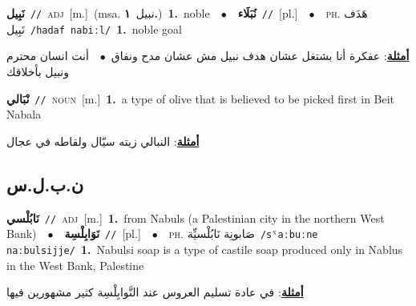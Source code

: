 \documentclass[10pt,a4paper,twoside]{article} %
\begin{document}
\begin{multicols}{2}
{\setlength\topsep{0pt}\textbf{\foreignlanguage{arabic}{نَبِيل}}\ {\color{gray}\texttt{//}\color{black}}\ \textsc{adj}\ [m.]\ \color{gray}(msa. \foreignlanguage{arabic}{نبيل}~\foreignlanguage{arabic}{\textbf{١.}})\color{black}\ \textbf{1.}~noble\ \ $\bullet$\ \ \setlength\topsep{0pt}\textbf{\foreignlanguage{arabic}{نُبَلَاء}}\ {\color{gray}\texttt{//}\color{black}}\ [pl.]\ \ $\bullet$\ \ \textsc{ph.} \color{gray} \foreignlanguage{arabic}{هَدَف نَبِيل}\color{black}\ {\color{gray}\texttt{/{\sffamily hadaf nabiːl}/}\color{black}}\ \textbf{1.}~noble goal\  \begin{flushright}\color{gray}\foreignlanguage{arabic}{\textbf{\underline{\foreignlanguage{arabic}{أمثلة}}}: عفكرة أنا بشتغل عشان هدف نبيل مش عشان مدح ونفاق\ $\bullet$\ \  أنت انسان محترم ونبيل بأخلاقك}\end{flushright}\color{black}} \vspace{2mm}

{\setlength\topsep{0pt}\textbf{\foreignlanguage{arabic}{نْبَالي}}\ {\color{gray}\texttt{//}\color{black}}\ \textsc{noun}\ [m.]\ \textbf{1.}~a type of olive that is believed to be picked first in Beit Nabala\  \begin{flushright}\color{gray}\foreignlanguage{arabic}{\textbf{\underline{\foreignlanguage{arabic}{أمثلة}}}: النبالي زيته سيّال ولقاطه في عجال}\end{flushright}\color{black}} \vspace{2mm}

\vspace{-3mm}
\subsection*{\color{blue}\foreignlanguage{arabic}{ن.ب.ل.س}\color{blue}{}} 

{\setlength\topsep{0pt}\textbf{\foreignlanguage{arabic}{نَابُلْسي}}\ {\color{gray}\texttt{//}\color{black}}\ \textsc{adj}\ [m.]\ \textbf{1.}~from Nabuls (a Palestinian city in the northern West Bank)\ \ $\bullet$\ \ \setlength\topsep{0pt}\textbf{\foreignlanguage{arabic}{نَوَابِلْسِة}}\ {\color{gray}\texttt{//}\color{black}}\ [pl.]\ \ $\bullet$\ \ \textsc{ph.} \color{gray} \foreignlanguage{arabic}{صَابونِة نَابُلْسيِّة}\color{black}\ {\color{gray}\texttt{/{\sffamily sˤaːbuːne naːbulsijje}/}\color{black}}\ \textbf{1.}~Nabulsi soap is a type of castile soap produced only in Nablus in the West Bank, Palestine\  \begin{flushright}\color{gray}\foreignlanguage{arabic}{\textbf{\underline{\foreignlanguage{arabic}{أمثلة}}}: في عادة تسليم العروس عند النَّوابِلْسِة كثير مشهورين فيها}\end{flushright}\color{black}} \vspace{2mm}


\end{multicols}
\end{document}
